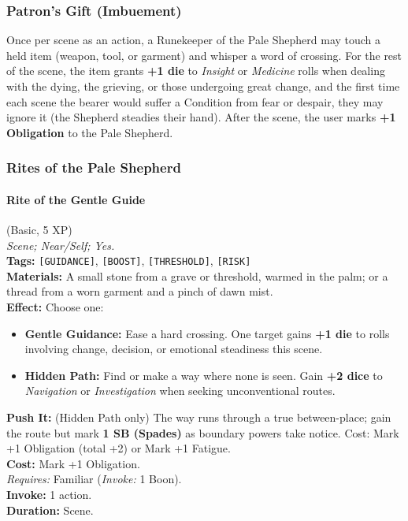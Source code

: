 \subsubsection*{Patron's Gift (Imbuement)}

Once per scene as an action, a Runekeeper of the Pale Shepherd may touch a held item (weapon, tool, or garment) and whisper a word of crossing. For the rest of the scene, the item grants \textbf{+1 die} to \textit{Insight} or \textit{Medicine} rolls when dealing with the dying, the grieving, or those undergoing great change, and the first time each scene the bearer would suffer a Condition from fear or despair, they may ignore it (the Shepherd steadies their hand). After the scene, the user marks \textbf{+1 Obligation} to the Pale Shepherd.

\subsubsection*{Rites of the Pale Shepherd}

\paragraph{Rite of the Gentle Guide} (Basic, 5 XP) \hfill \\
\emph{Scene; Near/Self; Yes.} \\
\textbf{Tags:} \texttt{[GUIDANCE]}, \texttt{[BOOST]}, \texttt{[THRESHOLD]}, \texttt{[RISK]} \\
\textbf{Materials:} A small stone from a grave or threshold, warmed in the palm; or a thread from a worn garment and a pinch of dawn mist. \\
\textbf{Effect:} Choose one:
\begin{itemize}
  \item \textbf{Gentle Guidance:} Ease a hard crossing. One target gains \textbf{+1 die} to rolls involving change, decision, or emotional steadiness this scene.
  \item \textbf{Hidden Path:} Find or make a way where none is seen. Gain \textbf{+2 dice} to \textit{Navigation} or \textit{Investigation} when seeking unconventional routes.
\end{itemize}
\textbf{Push It:} (Hidden Path only) The way runs through a true between-place; gain the route but mark \textbf{1 SB (Spades)} as boundary powers take notice. Cost: Mark +1 Obligation (total +2) or Mark +1 Fatigue. \\
\textbf{Cost:} Mark +1 Obligation. \\
\textit{Requires:} Familiar (\textit{Invoke:} 1 Boon). \\
\textbf{Invoke:} 1 action. \\
\textbf{Duration:} Scene.

